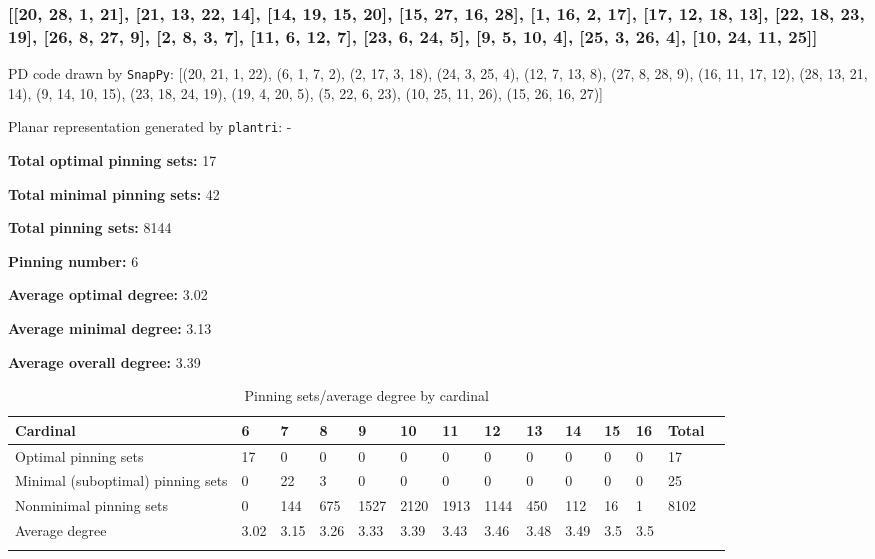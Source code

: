\documentclass{article}%
\begin{document}
\newpage

\subsubsection{[[20, 28, 1, 21], [21, 13, 22, 14], [14, 19, 15, 20], [15, 27, 16, 28], [1, 16, 2, 17], [17, 12, 18, 13], [22, 18, 23, 19], [26, 8, 27, 9], [2, 8, 3, 7], [11, 6, 12, 7], [23, 6, 24, 5], [9, 5, 10, 4], [25, 3, 26, 4], [10, 24, 11, 25]]}

{\small\noindent PD code drawn by \texttt{SnapPy}: [(20, 21, 1, 22), (6, 1, 7, 2), (2, 17, 3, 18), (24, 3, 25, 4), (12, 7, 13, 8), (27, 8, 28, 9), (16, 11, 17, 12), (28, 13, 21, 14), (9, 14, 10, 15), (23, 18, 24, 19), (19, 4, 20, 5), (5, 22, 6, 23), (10, 25, 11, 26), (15, 26, 16, 27)]}

{\small\noindent Planar representation generated by \texttt{plantri}: -}

\begin{multicols}{2}
{\normalsize \noindent\textbf{Total optimal pinning sets:} 17

\noindent\textbf{Total minimal pinning sets:} 42

\noindent\textbf{Total pinning sets:} 8144

\noindent\textbf{Pinning number:} 6

}
\columnbreak

{\normalsize \noindent\textbf{Average optimal degree:} 3.02

\noindent\textbf{Average minimal degree:} 3.13

\noindent\textbf{Average overall degree:} 3.39

}
\end{multicols}

\begin{table}[ht]
	\caption{Pinning sets/average degree by cardinal}
	\centering
	\renewcommand{\arraystretch}{1.5}
	\begin{tabularx}{\textwidth}{lXXXXXXXXXXXXX}
		\toprule
			Cardinal & 6 & 7 & 8 & 9 & 10 & 11 & 12 & 13 & 14 & 15 & 16 & Total\\
			\hline
			Optimal pinning sets & 17 & 0 & 0 & 0 & 0 & 0 & 0 & 0 & 0 & 0 & 0 & 17 \\
			Minimal (suboptimal) pinning sets & 0 & 22 & 3 & 0 & 0 & 0 & 0 & 0 & 0 & 0 & 0 & 25 \\
			Nonminimal pinning sets & 0 & 144 & 675 & 1527 & 2120 & 1913 & 1144 & 450 & 112 & 16 & 1 & 8102 \\
			Average degree & 3.02 & 3.15 & 3.26 & 3.33 & 3.39 & 3.43 & 3.46 & 3.48 & 3.49 & 3.5 & 3.5 &  \\
		\bottomrule \\ 
	\end{tabularx}
\end{table}
\end{document}
